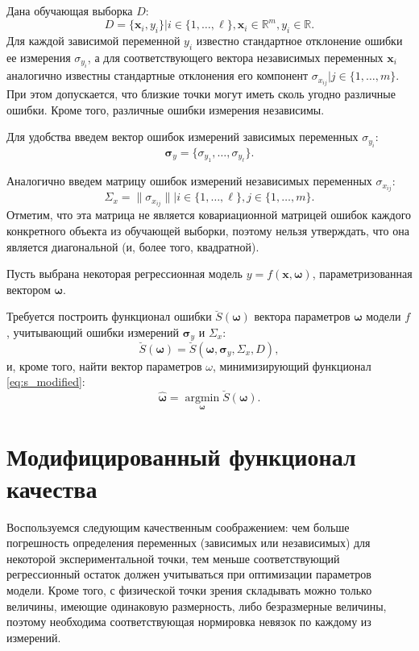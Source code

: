 \documentclass[tikz,10pt,a4paper]{article}
\newcommand{\bomega}{\boldsymbol{\omega}}
\begin{document}
Дана обучающая выборка $D$:
\begin{equation}
  D = \{ \mathbf{x}_i, y_i \} | i \in \{ 1, \dots, \ell \}, \mathbf{x}_i \in \mathbb{R}^m, y_i \in \mathbb{R}.
  \label{eq:d}
\end{equation}
Для каждой зависимой переменной $y_i$ известно
стандартное отклонение ошибки ее измерения $\sigma_{y_i}$, а для соответствующего
вектора независимых переменных $\mathbf{x}_i$ аналогично известны стандартные
отклонения его компонент $\sigma_{x_{ij}} | j \in \{ 1, \dots, m \}$.
При этом допускается, что близкие точки могут иметь сколь угодно различные ошибки.
Кроме того, различные ошибки измерения независимы.

Для удобства введем вектор ошибок измерений зависимых переменных $\sigma_{y_i}$:
\[
  \boldsymbol{\sigma}_y = \{ \sigma_{y_1}, \dots, \sigma_{y_{\ell}} \}.
\]

Аналогично введем матрицу ошибок измерений независимых переменных $\sigma_{x_{ij}}$:
\[
  \Sigma_x = \| \sigma_{x_{ij}} \| | i \in \{ 1, \dots, \ell \}, j \in \{ 1, \dots, m \}.
\]
Отметим, что эта матрица не является
ковариационной матрицей ошибок
каждого конкретного объекта из обучающей выборки,
поэтому нельзя утверждать, что она является
диагональной (и, более того, квадратной).

Пусть выбрана некоторая регрессионная модель
$y = f (\mathbf{x}, \bomega)$, параметризованная вектором $\bomega$.

Требуется построить функционал ошибки $\breve{S}(\bomega)$ вектора параметров
$\bomega$ модели $f$, учитывающий ошибки измерений $\boldsymbol{\sigma}_y$ и
$\Sigma_x$:
\begin{equation}
  \breve{S}(\bomega) = \breve{S}(\bomega, \boldsymbol{\sigma}_y, \Sigma_x, D),
  \label{eq:s_modified}
\end{equation}
и, кроме того, найти вектор параметров $\omega$, минимизирующий функционал
\eqref{eq:s_modified}:
\begin{equation}
  \hat{\bomega} = \mathop{\arg \min}\limits_{\bomega} \breve{S}(\bomega).
\end{equation}

\section{Модифицированный функционал качества}

Воспользуемся следующим качественным соображением:
чем больше погрешность определения переменных (зависимых или независимых)
для некоторой экспериментальной точки, тем меньше соответствующий
регрессионный остаток должен учитываться при оптимизации параметров модели.
Кроме того, с физической точки зрения складывать
можно только величины, имеющие одинаковую размерность, либо безразмерные
величины, поэтому необходима соответствующая нормировка невязок по каждому из
измерений.
\end{document}
